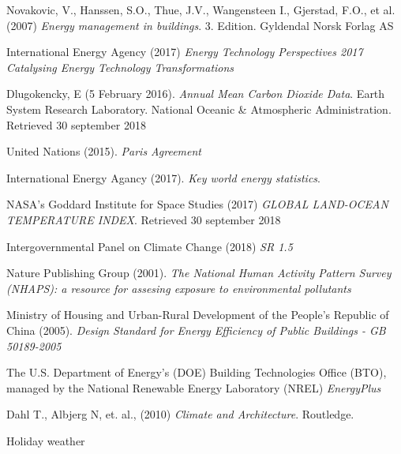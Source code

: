 \begin{thebibliography}{1}

 Novakovic, V., Hanssen, S.O., Thue, J.V., Wangensteen I., Gjerstad, F.O., et al.(2007) \textit{Energy management in buildings}. 3. Edition. Gyldendal Norsk Forlag AS 

 International Energy Agency (2017) \textit{Energy Technology Perspectives 2017
Catalysing Energy Technology Transformations} %

 Dlugokencky, E (5 February 2016). \textit{Annual Mean Carbon Dioxide Data}. Earth System Research Laboratory. National Oceanic \& Atmospheric Administration. Retrieved 30 september 2018

 United Nations (2015). \textit{Paris Agreement}

 International Energy Agancy (2017). \textit{Key world
energy statistics}.

 NASA's Goddard Institute for Space Studies (2017) \textit{GLOBAL LAND-OCEAN TEMPERATURE INDEX}.  Retrieved 30 september 2018 %

  Intergovernmental  Panel  on  Climate  Change (2018) \textit{SR 1.5}

 Nature Publishing Group (2001). \textit{The National Human Activity Pattern Survey (NHAPS): a resource for assesing exposure to environmental pollutants}

 Ministry of Housing and Urban-Rural Development of the People's Republic of China (2005). \textit{Design Standard for Energy Efficiency of Public Buildings - GB 50189-2005}

 The U.S. Department of Energy’s (DOE) Building Technologies Office (BTO), managed by the National Renewable Energy Laboratory (NREL) \textit{EnergyPlus}

 Dahl T., Albjerg N, et. al., (2010) \textit{Climate and Architecture}. Routledge. 

 Holiday weather %

\end{thebibliography}
